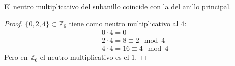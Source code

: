 \begin{ce}
    El neutro multiplicativo del subanillo coincide con la del anillo principal.
\end{ce}

\begin{proof}
    $\{0,2,4\} \subset \mathbb{Z}_{6}$ tiene como neutro multiplicativo al $4$:
    \begin{equation}
        \begin{split}
            & 0 \cdot 4 = 0\\
            & 2 \cdot 4 = 8 \equiv 2 \mod 4\\
            & 4 \cdot 4 = 16 \equiv 4 \mod 4
        \end{split}
    \end{equation}
    Pero en $\mathbb{Z}_{6}$ el neutro multiplicativo es el $1$.
\end{proof}
